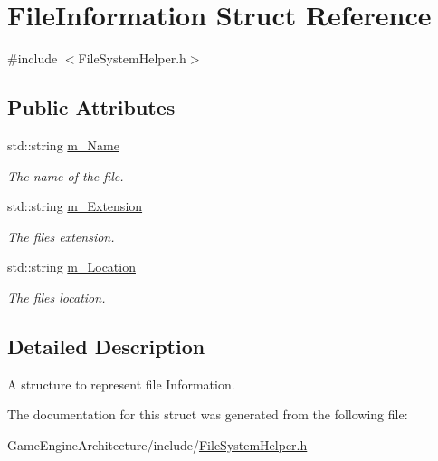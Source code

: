 \hypertarget{struct_file_information}{}\section{File\+Information Struct Reference}
\label{struct_file_information}


{\ttfamily \#include $<$File\+System\+Helper.\+h$>$}

\subsection*{Public Attributes}
\begin{DoxyCompactItemize}
\item 
\mbox{\label{struct_file_information_a6eb3c01cbd4c455b4439c35511a4d4d6}} 
std\+::string \mbox{\hyperlink{struct_file_information_a6eb3c01cbd4c455b4439c35511a4d4d6}{m\+\_\+\+Name}}
\begin{DoxyCompactList}\small\item\em The name of the file. \end{DoxyCompactList}\item 
\mbox{\label{struct_file_information_abf0c18a5cc65112423af1dd9691ae16b}} 
std\+::string \mbox{\hyperlink{struct_file_information_abf0c18a5cc65112423af1dd9691ae16b}{m\+\_\+\+Extension}}
\begin{DoxyCompactList}\small\item\em The file\textquotesingle{}s extension. \end{DoxyCompactList}\item 
\mbox{\label{struct_file_information_a76b5eb99421ffb6465611bfdadb6fb64}} 
std\+::string \mbox{\hyperlink{struct_file_information_a76b5eb99421ffb6465611bfdadb6fb64}{m\+\_\+\+Location}}
\begin{DoxyCompactList}\small\item\em The file\textquotesingle{}s location. \end{DoxyCompactList}\end{DoxyCompactItemize}


\subsection{Detailed Description}
A structure to represent file Information. 

The documentation for this struct was generated from the following file\+:\begin{DoxyCompactItemize}
\item 
Game\+Engine\+Architecture/include/\mbox{\hyperlink{_file_system_helper_8h}{File\+System\+Helper.\+h}}\end{DoxyCompactItemize}
